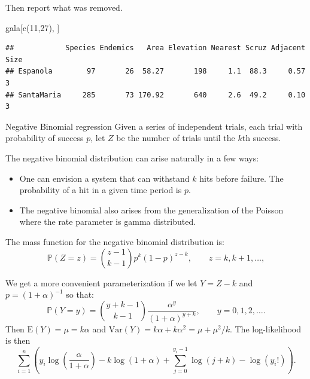 \documentclass[
  ignorenonframetext,
]{beamer}
\newenvironment{Shaded}{\begin{snugshade}}{\end{snugshade}}
\newcommand{\DecValTok}[1]{\textcolor[rgb]{0.00,0.00,0.81}{#1}}
\newcommand{\FunctionTok}[1]{\textcolor[rgb]{0.00,0.00,0.00}{#1}}
\newcommand{\NormalTok}[1]{#1}
\providecommand{\tightlist}{%
  \setlength{\itemsep}{0pt}\setlength{\parskip}{0pt}}
\begin{document}
\begin{frame}[fragile]{}
\protect\hypertarget{section-27}{}
Then report what was removed.

\vspace{12pt}
\tiny

\begin{Shaded}
\begin{Highlighting}[]
\NormalTok{gala[}\FunctionTok{c}\NormalTok{(}\DecValTok{11}\NormalTok{,}\DecValTok{27}\NormalTok{), ]}
\end{Highlighting}
\end{Shaded}

\begin{verbatim}
##            Species Endemics   Area Elevation Nearest Scruz Adjacent Size
## Espanola        97       26  58.27       198     1.1  88.3     0.57    3
## SantaMaria     285       73 170.92       640     2.6  49.2     0.10    3
\end{verbatim}
\end{frame}

\begin{frame}{Negative Binomial regression}
\protect\hypertarget{negative-binomial-regression}{}
Given a series of independent trials, each trial with probability of
success \(p\), let \(Z\) be the number of trials until the \(k\)th
success.

\vspace{12pt}

The negative binomial distribution can arise naturally in a few ways:

\begin{itemize}
\tightlist
\item
  One can envision a system that can withstand \(k\) hits before
  failure. The probability of a hit in a given time period is \(p\).
\item
  The negative binomial also arises from the generalization of the
  Poisson where the rate parameter is gamma distributed.
\end{itemize}
\end{frame}

\begin{frame}{}
\protect\hypertarget{section-28}{}
The mass function for the negative binomial distribution is: \[
  \mathbb{P}(Z = z) = {z-1 \choose k-1}p^k(1-p)^{z-k}, \qquad z = k,k+1,\ldots,
\]

\vspace{12pt}

We get a more convenient parameterization if we let \(Y = Z - k\) and
\(p = (1 + \alpha)^{-1}\) so that: \[
  \mathbb{P}(Y=y) = {y+k-1 \choose k-1} \frac{\alpha^y}{(1+\alpha)^{y+k}}, \qquad y = 0,1,2,\ldots.
\] Then \(\mathrm{E}(Y) = \mu = k\alpha\) and
\(\mathrm{Var}(Y) = k\alpha + k\alpha^2 = \mu + \mu^2/k\). The
log-likelihood is then \[
  \sum_{i=1}^n\left(y_i\log\left(\frac{\alpha}{1 + \alpha}\right) - k\log(1 + \alpha) 
    + \sum_{j=0}^{y_i-1}\log(j+k) - \log(y_i!)\right).
\]
\end{frame}
\end{document}
